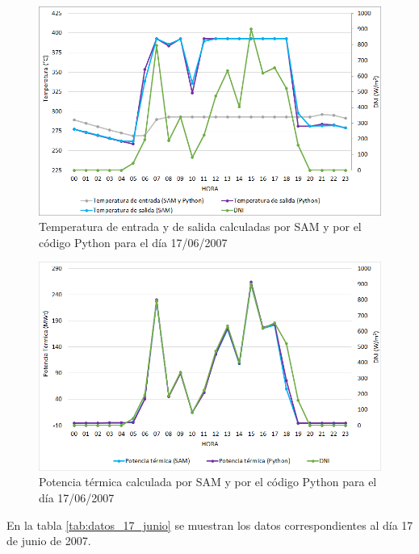 \begin{figure}[H]
\includegraphics[width=0.9\linewidth]{images/176temperatura.png}
\caption{Temperatura de entrada y de salida calculadas por SAM y por el código Python para el día 17/06/2007} 
\label{fig:176temperatura}
\end{figure}

\begin{figure}[H]
\includegraphics[width=0.9\linewidth]{images/176potencia.png}
\caption{Potencia térmica calculada por SAM y por el código Python para el día 17/06/2007} 
\label{fig:176potencia}
\end{figure}

En la tabla \ref{tab:datos_17_junio} se muestran los datos correspondientes al día 17 de junio de 2007.

